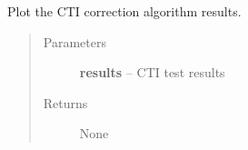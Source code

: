 \documentclass[a4paper,12pt,english]{sphinxmanual}
\begin{document}
\begin{fulllineitems}
\label{analysis:analysis.testCTIcorrection.plotResults}
Plot the CTI correction algorithm results.
\begin{quote}\begin{description}
\item[{Parameters}] \leavevmode
\textbf{results} -- CTI test results

\item[{Returns}] \leavevmode
None

\end{description}\end{quote}

\end{fulllineitems}

\end{document}
